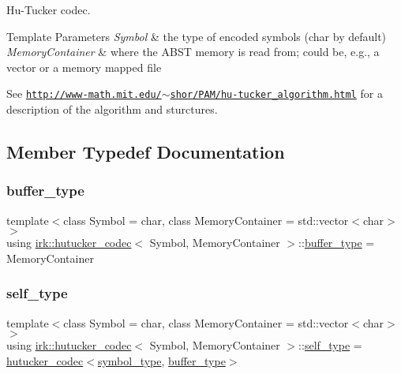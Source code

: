 Hu-\/\+Tucker codec. 


\begin{DoxyTemplParams}{Template Parameters}
{\em Symbol} & the type of encoded symbols ({\ttfamily char} by default) \\
\hline
{\em Memory\+Container} & where the A\+B\+ST memory is read from; could be, e.\+g., a vector or a memory mapped file\\
\hline
\end{DoxyTemplParams}
See \href{http://www-math.mit.edu/~shor/PAM/hu-tucker_algorithm.html}{\tt http\+://www-\/math.\+mit.\+edu/$\sim$shor/\+P\+A\+M/hu-\/tucker\+\_\+algorithm.\+html} for a description of the algorithm and sturctures. 

\subsection{Member Typedef Documentation}
\mbox{\label{classirk_1_1hutucker__codec_a995378c8c253dae9867a4b1762eeaf95}} 
\subsubsection{\texorpdfstring{buffer\+\_\+type}{buffer\_type}}
{\footnotesize\ttfamily template$<$class Symbol = char, class Memory\+Container = std\+::vector$<$char$>$$>$ \\
using \mbox{\hyperlink{classirk_1_1hutucker__codec}{irk\+::hutucker\+\_\+codec}}$<$ Symbol, Memory\+Container $>$\+::\mbox{\hyperlink{classirk_1_1hutucker__codec_a995378c8c253dae9867a4b1762eeaf95}{buffer\+\_\+type}} =  Memory\+Container}

\mbox{\label{classirk_1_1hutucker__codec_a507a089f939f5fd77a38245598e5a9a2}} 
\subsubsection{\texorpdfstring{self\+\_\+type}{self\_type}}
{\footnotesize\ttfamily template$<$class Symbol = char, class Memory\+Container = std\+::vector$<$char$>$$>$ \\
using \mbox{\hyperlink{classirk_1_1hutucker__codec}{irk\+::hutucker\+\_\+codec}}$<$ Symbol, Memory\+Container $>$\+::\mbox{\hyperlink{classirk_1_1hutucker__codec_a507a089f939f5fd77a38245598e5a9a2}{self\+\_\+type}} =  \mbox{\hyperlink{classirk_1_1hutucker__codec}{hutucker\+\_\+codec}}$<$\mbox{\hyperlink{classirk_1_1hutucker__codec_af23dee5959ae2a69eea0ab324cf6ecb6}{symbol\+\_\+type}}, \mbox{\hyperlink{classirk_1_1hutucker__codec_a995378c8c253dae9867a4b1762eeaf95}{buffer\+\_\+type}}$>$}

